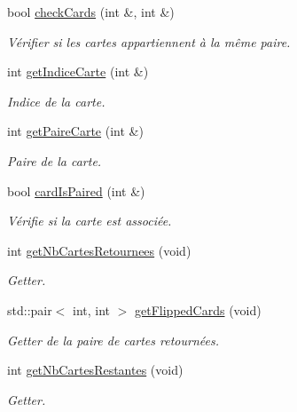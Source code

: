 \begin{DoxyCompactItemize}
\mbox{\label{class_mod_memory_ab037bba20af618761450a5bf4e221d4b}} 
bool \hyperlink{class_mod_memory_ab037bba20af618761450a5bf4e221d4b}{check\+Cards} (int \&, int \&)
\begin{DoxyCompactList}\small\item\em Vérifier si les cartes appartiennent à la même paire. \end{DoxyCompactList}\item 
int \hyperlink{class_mod_memory_a2ea383b6a13143c4f1f5fa9534e6faa6}{get\+Indice\+Carte} (int \&)
\begin{DoxyCompactList}\small\item\em Indice de la carte. \end{DoxyCompactList}\item 
\mbox{\label{class_mod_memory_a0f00b2aabc36bccd1eae114917b0bdc3}} 
int \hyperlink{class_mod_memory_a0f00b2aabc36bccd1eae114917b0bdc3}{get\+Paire\+Carte} (int \&)
\begin{DoxyCompactList}\small\item\em Paire de la carte. \end{DoxyCompactList}\item 
\mbox{\label{class_mod_memory_a01b946e68364a820b65e4681b4b87ed8}} 
bool \hyperlink{class_mod_memory_a01b946e68364a820b65e4681b4b87ed8}{card\+Is\+Paired} (int \&)
\begin{DoxyCompactList}\small\item\em Vérifie si la carte est associée. \end{DoxyCompactList}\item 
\mbox{\label{class_mod_memory_a42de695b99429f9a9461db78b2375e3a}} 
int \hyperlink{class_mod_memory_a42de695b99429f9a9461db78b2375e3a}{get\+Nb\+Cartes\+Retournees} (void)
\begin{DoxyCompactList}\small\item\em Getter. \end{DoxyCompactList}\item 
\mbox{\label{class_mod_memory_a00449888edb65708081e0e074391a28c}} 
std\+::pair$<$ int, int $>$ \hyperlink{class_mod_memory_a00449888edb65708081e0e074391a28c}{get\+Flipped\+Cards} (void)
\begin{DoxyCompactList}\small\item\em Getter de la paire de cartes retournées. \end{DoxyCompactList}\item 
\mbox{\label{class_mod_memory_ada71dd41fee113c35c644f4c2e335096}} 
int \hyperlink{class_mod_memory_ada71dd41fee113c35c644f4c2e335096}{get\+Nb\+Cartes\+Restantes} (void)
\begin{DoxyCompactList}\small\item\em Getter. \end{DoxyCompactList}\end{DoxyCompactItemize}


